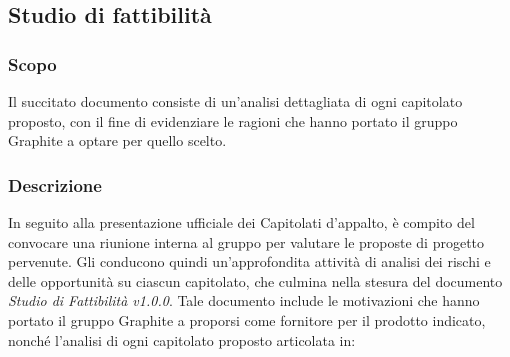 \documentclass[../NormediProgetto.tex]{subfiles}
\begin{document}

\subsection{Studio di fattibilità}

\subsubsection{Scopo}

Il succitato documento consiste di un'analisi dettagliata di ogni capitolato proposto, con il fine di evidenziare le ragioni che hanno portato il gruppo Graphite a optare per quello scelto. 

\subsubsection{Descrizione}
In seguito alla presentazione ufficiale dei Capitolati d'appalto, è compito del  convocare una riunione interna al gruppo per valutare le proposte di progetto pervenute. Gli  conducono quindi un'approfondita attività di analisi dei rischi e delle opportunità su ciascun capitolato, che culmina nella stesura del documento \textit{Studio di Fattibilità v1.0.0}.
Tale documento include le motivazioni che hanno portato il gruppo Graphite a proporsi come fornitore per il prodotto indicato, nonché l'analisi di ogni capitolato proposto articolata in:
\end{document}
